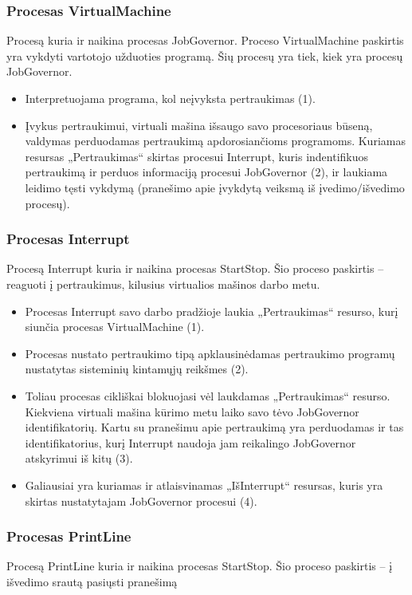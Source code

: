 \subsubsection{Procesas VirtualMachine}
Procesą kuria ir naikina procesas JobGovernor. Proceso VirtualMachine paskirtis yra vykdyti vartotojo užduoties programą. Šių procesų yra tiek, kiek yra procesų JobGovernor.
	\begin{itemize}
		\item Interpretuojama programa, kol neįvyksta pertraukimas (1).
		\item Įvykus pertraukimui, virtuali mašina išsaugo savo procesoriaus būseną, valdymas perduodamas pertraukimą apdorosiančioms programoms. Kuriamas resursas „Pertraukimas“ skirtas procesui Interrupt, kuris indentifikuos pertraukimą ir perduos informaciją procesui JobGovernor (2), ir laukiama leidimo tęsti vykdymą (pranešimo apie įvykdytą veiksmą iš įvedimo/išvedimo procesų).
	\end{itemize}
\subsubsection{Procesas Interrupt}
Procesą Interrupt kuria ir naikina procesas StartStop. Šio proceso paskirtis – reaguoti į pertraukimus, kilusius virtualios mašinos darbo metu. 
	\begin{itemize}
		\item Procesas Interrupt savo darbo pradžioje laukia „Pertraukimas“ resurso, kurį siunčia procesas VirtualMachine (1).
		\item  Procesas nustato pertraukimo tipą apklausinėdamas pertraukimo programų nustatytas sisteminių kintamųjų reikšmes (2).
		\item Toliau procesas cikliškai blokuojasi vėl laukdamas „Pertraukimas“ resurso. Kiekviena virtuali mašina kūrimo metu laiko savo tėvo JobGovernor identifikatorių. Kartu su pranešimu apie pertraukimą yra perduodamas ir tas identifikatorius, kurį Interrupt naudoja jam reikalingo JobGovernor atskyrimui iš kitų (3).
		\item Galiausiai yra kuriamas ir atlaisvinamas „IšInterrupt“ resursas, kuris yra skirtas nustatytajam JobGovernor procesui (4). 
	\end{itemize}
\subsubsection{Procesas PrintLine}
Procesą PrintLine kuria ir naikina procesas StartStop. Šio proceso paskirtis – į išvedimo srautą pasiųsti pranešimą
	
